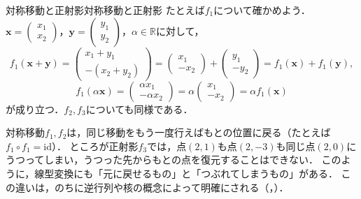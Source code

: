 \begin{example}{対称移動と正射影}{対称移動と正射影}
  たとえば$f_1$について確かめよう．
  $\bm{x} = \begin{pmatrix} x_1 \\ x_2 \end{pmatrix}$，$\bm{y} = \begin{pmatrix} y_1 \\ y_2 \end{pmatrix}$，$\alpha \in \mathbb{R}$に対して，
  \[
    f_1(\bm{x} + \bm{y})
    = \begin{pmatrix} x_1 + y_1 \\ -(x_2 + y_2) \end{pmatrix}
    = \begin{pmatrix} x_1 \\ -x_2 \end{pmatrix} + \begin{pmatrix} y_1 \\ -y_2 \end{pmatrix}
    = f_1(\bm{x}) + f_1(\bm{y}),
  \]
  \[
    f_1(\alpha\bm{x})
    = \begin{pmatrix} \alpha x_1 \\ -\alpha x_2 \end{pmatrix}
    = \alpha \begin{pmatrix} x_1 \\ -x_2 \end{pmatrix}
    = \alpha f_1(\bm{x})
  \]
  が成り立つ．$f_2,f_3$についても同様である．
\end{example}

対称移動$f_1,f_2$は，同じ移動をもう一度行えばもとの位置に戻る（たとえば$f_1 \circ f_1 = \mathrm{id}$）．
ところが正射影$f_3$では，点$(2, 1)$も点$(2, -3)$も同じ点$(2, 0)$にうつってしまい，うつった先からもとの点を復元することはできない．
このように，線型変換にも「元に戻せるもの」と「つぶれてしまうもの」がある．
この違いは，のちに逆行列や核の概念によって明確にされる（，）．

